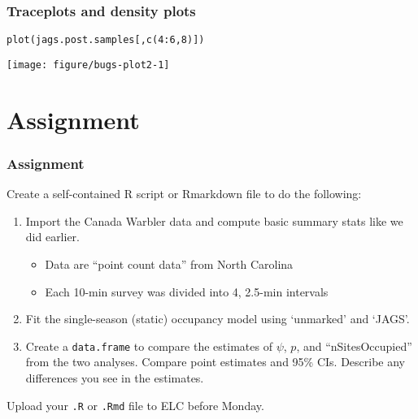\documentclass[color=usenames,dvipsnames]{beamer}\usepackage[]{graphicx}\usepackage[]{color}
\makeatletter
\newcommand{\hlnum}[1]{\textcolor[rgb]{0.69,0.494,0}{#1}}%
\newcommand{\hlopt}[1]{\textcolor[rgb]{0,0,0}{#1}}%
\newcommand{\hlstd}[1]{\textcolor[rgb]{0,0,0}{#1}}%
\newcommand{\hlkwd}[1]{\textcolor[rgb]{0.004,0.004,0.506}{#1}}%
\newenvironment{kframe}{%
 \def\at@end@of@kframe{}%
 \ifinner\ifhmode%
  \def\at@end@of@kframe{\end{minipage}}%
  \begin{minipage}{\columnwidth}%
 \fi\fi%
 \def\FrameCommand##1{\hskip\@totalleftmargin \hskip-\fboxsep
 \colorbox{shadecolor}{##1}\hskip-\fboxsep
     \hskip-\linewidth \hskip-\@totalleftmargin \hskip\columnwidth}%
 \MakeFramed {\advance\hsize-\width
   \@totalleftmargin\z@ \linewidth\hsize
   \@setminipage}}%
 {\par\unskip\endMakeFramed%
 \at@end@of@kframe}
\newenvironment{knitrout}{}{} %
\newcommand{\inr}[1]{\colorbox{inlinecolor}{\texttt{#1}}}
\makeatother
\begin{document}
\begin{frame}[fragile]
  \frametitle{Traceplots and density plots}
\begin{knitrout}\footnotesize
{}\color{fgcolor}\begin{kframe}
\begin{alltt}
\hlkwd{plot}\hlstd{(jags.post.samples[,}\hlkwd{c}\hlstd{(}\hlnum{4}\hlopt{:}\hlnum{6}\hlstd{,}\hlnum{8}\hlstd{)])}
\end{alltt}
\end{kframe}

{\centering \texttt{[image: figure/bugs-plot2-1]} 

}



\end{knitrout}
\end{frame}


\section{Assignment}











\begin{frame}
  \frametitle{Assignment}
  \small
  Create a self-contained R script or Rmarkdown file
  to do the following:
  \begin{enumerate}
    \small
    \item Import the Canada Warbler data and compute basic summary
      stats like we did earlier.
    \begin{itemize}
      \item Data are ``point count data'' from North Carolina
      \item Each 10-min survey was divided into 4, 2.5-min intervals 
    \end{itemize}
    \item Fit the single-season (static) occupancy model using
      `unmarked' and `JAGS'. 
    \item Create a \inr{data.frame} to compare the estimates of
      $\psi$, $p$, and ``nSitesOccupied'' from the two
      analyses. Compare point estimates and 95\% CIs. Describe any
      differences you see in the estimates.
  \end{enumerate}
  Upload your {\tt .R} or {\tt .Rmd} file to ELC before Monday. 
\end{frame}
\end{document}
